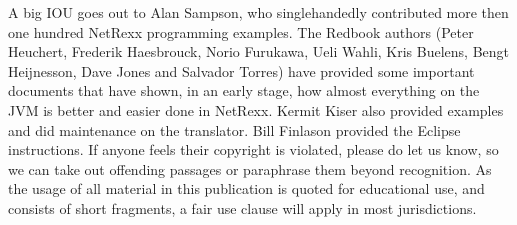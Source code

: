 A big IOU goes out to Alan Sampson, who singlehandedly contributed more then one hundred NetRexx programming examples. The Redbook authors (Peter Heuchert, Frederik Haesbrouck, Norio Furukawa, Ueli Wahli, Kris Buelens, Bengt Heijnesson, Dave Jones and Salvador Torres) have provided some important documents that have shown, in an early stage, how almost everything on the JVM is better and easier done in NetRexx. Kermit Kiser also provided examples and did maintenance on the translator. Bill Finlason provided the Eclipse instructions. If anyone feels their copyright is violated, please do let us know, so we can take out offending passages or paraphrase them beyond recognition. As the usage of all material in this publication is quoted for educational use, and consists of short fragments, a fair use clause will apply in most jurisdictions.


